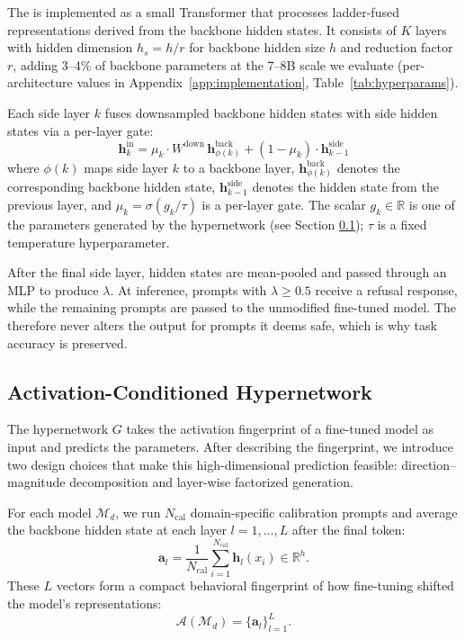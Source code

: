 

 The \ssn{} is implemented as a small Transformer that processes ladder-fused representations derived from the backbone hidden states. It consists of $K$ layers with hidden dimension $h_s = h/r$ for backbone hidden size $h$ and reduction factor $r$, adding 3--4\% of backbone parameters at the 7--8B scale we evaluate (per-architecture values in Appendix~\ref{app:implementation}, Table~\ref{tab:hyperparams}).

 Each side layer $k$ fuses downsampled backbone hidden states with side hidden states via a per-layer gate:
\begin{equation}
    \mathbf{h}_{k}^\text{in} = \mu_k \cdot W^\text{down}\, \mathbf{h}_{\phi(k)}^\text{back} + (1{-}\mu_k) \cdot \mathbf{h}_{k-1}^\text{side}
\end{equation}
where $\phi(k)$ maps side layer $k$ to a backbone layer, $\mathbf{h}_{\phi(k)}^\text{back}$ denotes the corresponding backbone hidden state, $\mathbf{h}_{k-1}^\text{side}$ denotes the \ssn{} hidden state from the previous layer, and $\mu_k = \sigma(g_k/\tau)$ is a per-layer gate. The scalar $g_k \in \mathbb{R}$ is one of the parameters generated by the hypernetwork (see Section \ref{sec:hypernet}); $\tau$ is a fixed temperature hyperparameter.

 After the final side layer, hidden states are mean-pooled and passed through an MLP to produce $\lambda$. At inference, prompts with $\lambda \geq 0.5$ receive a refusal response, while the remaining prompts are passed to the unmodified fine-tuned model. The \ssn{} therefore never alters the output for prompts it deems safe, which is why task accuracy is preserved.

\subsection{Activation-Conditioned Hypernetwork}
\label{sec:hypernet}

The hypernetwork $G$ takes the activation fingerprint of a fine-tuned model as input and predicts the \ssn{} parameters. After describing the fingerprint, we introduce two design choices that make this high-dimensional prediction feasible: direction--magnitude decomposition and layer-wise factorized generation.


 For each model $\mathcal{M}_d$, we run $N_\text{cal}$ domain-specific calibration prompts and average the backbone hidden state at each layer $l = 1, \dots, L$ after the final token:
\begin{equation}
    \mathbf{a}_l = \frac{1}{N_\text{cal}} \sum_{i=1}^{N_\text{cal}} \mathbf{h}_l(x_i) \in \mathbb{R}^{h}.
\end{equation}
These $L$ vectors form a compact behavioral fingerprint of how fine-tuning shifted the model's representations:
\begin{equation}
    \mathcal{A}(\mathcal{M}_d) = \{\mathbf{a}_l\}_{l=1}^L.
    \label{eq:all_activations}
\end{equation}

